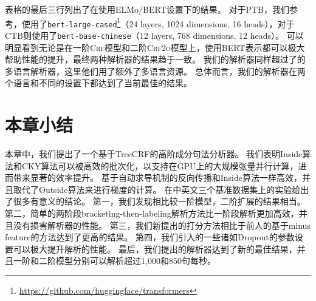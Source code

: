 表格的最后三行列出了在使用ELMo/BERT设置下的结果。
对于PTB，我们参考\citet{kitaev-etal-2019-multilingual}，使用了\texttt{bert-large-cased}\footnote{\url{https://github.com/huggingface/transformers}}（24 layers, 1024 dimensions, 16 heads），对于CTB则使用了\texttt{bert-base-chinese}（12 layers, 768 dimensions, 12 heads）。
可以明显看到无论是在一阶\textsc{Crf}模型和二阶\textsc{Crf2o}模型上，使用BERT表示都可以极大帮助性能的提升，最终两种解析器的结果趋于一致。
我们的解析器同样超过了\citet{kitaev-etal-2019-multilingual}的多语言解析器，这里他们用了额外了多语言资源。
总体而言，我们的解析器在两个语言和不同的设置下都达到了当前最佳的结果。

\section{本章小结}\label{sec:con-conclusions}

本章中，我们提出了一个基于TreeCRF的高阶成分句法分析器。
我们表明Inside算法和CKY算法可以被高效的批次化，以支持在GPU上的大规模张量并行计算，进而带来显著的效率提升。
基于自动求导机制的反向传播和Inside算法一样高效，并且取代了Outside算法来进行梯度的计算。
在中英文三个基准数据集上的实验给出了很多有意义的结论。
第一，我们发现相比较一阶模型，二阶扩展的结果相当。
第二，简单的两阶段bracketing-then-labeling解析方法比一阶段解析更加高效，并且没有损害解析器的性能。
第三，我们新提出的打分方法相比于前人的基于minus feature的方法达到了更高的结果。
第四，我们引入的一些诸如Dropout的参数设置可以极大提升解析的性能。
最后，我们提出的解析器达到了新的最佳结果，并且一阶和二阶模型分别可以解析超过1,000和850句每秒。
